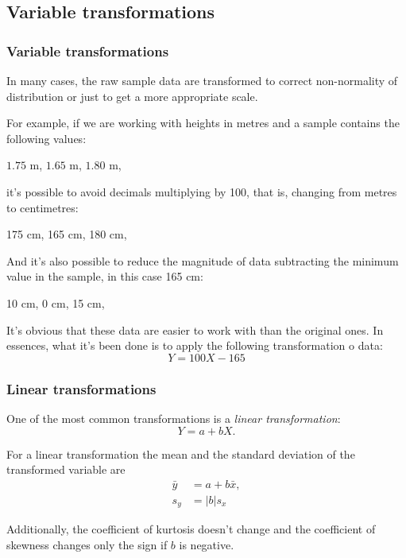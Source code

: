 \subsection{Variable transformations}

\begin{frame}
\frametitle{Variable transformations}
In many cases, the raw sample data are transformed to correct non-normality of distribution or just to get a more
appropriate scale.

For example, if we are working with heights in metres and a sample contains the following values:
\begin{center}
$1.75$ m, $1.65$ m, $1.80$ m,
\end{center}
it's possible to avoid decimals multiplying by 100, that is, changing from metres to centimetres:
\begin{center}
175 cm, 165 cm, 180 cm,
\end{center}
And it's also possible to reduce the magnitude of data subtracting the minimum value in the sample, in this case 165 cm:
\begin{center}
10 cm, 0 cm, 15 cm,
\end{center}
It's obvious that these data are easier to work with than the original ones.
In essences, what it's been done is to apply the following transformation o data:
\[Y= 100X-165\]
\end{frame}


\begin{frame}
\frametitle{Linear transformations}
One of the most common transformations is a \emph{linear transformation}:
\[
Y=a+bX.
\]

For a linear transformation the mean and the standard deviation of the transformed variable are
\begin{align*}
\bar y &= a+ b\bar x,\\
s_{y} &= |b|s_{x}
\end{align*}

Additionally, the coefficient of kurtosis doesn't change and the coefficient of skewness changes only the sign if $b$ is
negative.
\end{frame}


